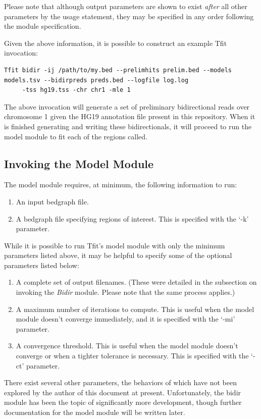 \documentclass[12pt,letterpaper]{article}
\begin{document}
Please note that although output parameters are shown to exist \textit{after} all other parameters by the usage statement, they may be specified in any order following the module specification.


Given the above information, it is possible to construct an example Tfit invocation:
\begin{lstlisting}
Tfit bidir -ij /path/to/my.bed --prelimhits prelim.bed --models models.tsv --bidirpreds preds.bed --logfile log.log
     -tss hg19.tss -chr chr1 -mle 1
\end{lstlisting}

The above invocation will generate a set of preliminary bidirectional reads over chromosome 1 given the HG19 annotation file present in this repository. When it is finished generating and writing these bidirectionals, it will proceed to run the model module to fit each of the regions called.

\subsection{Invoking the Model Module}
The model module requires, at minimum, the following information to run:
\begin{enumerate}
\item An input bedgraph file.
\item A bedgraph file specifying regions of interest. This is specified with the `-k' parameter.
\end{enumerate}

While it is possible to run Tfit's model module with only the minimum parameters listed above, it may be helpful to specify some of the optional parameters listed below:

\begin{enumerate}
\item A complete set of output filenames. (These were detailed in the subsection on invoking the \textit{Bidir} module. Please note that the same process applies.)
\item A maximum number of iterations to compute. This is useful when the model module doesn't converge immediately, and it is specified with the `-mi' parameter.
\item A convergence threshold. This is useful when the model module doesn't converge or when a tighter tolerance is necessary. This is specified with the `-ct' parameter.
\end{enumerate}

There exist several other parameters, the behaviors of which have not been explored by the author of this document at present. Unfortunately, the bidir module has been the topic of significantly more development, though further documentation for the model module will be written later. 
\end{document}
